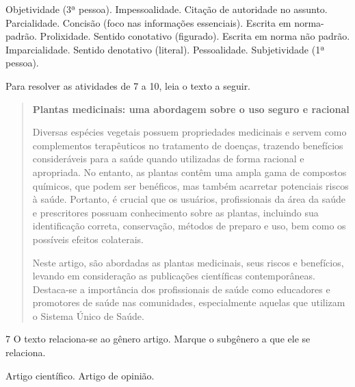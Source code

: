 \begin{boxlist}
 Objetividade (3ª pessoa). 
 Impessoalidade.
 Citação de autoridade no assunto. 
 Parcialidade. 
 Concisão (foco nas informações essenciais). 
 Escrita em norma-padrão. 
 Prolixidade.
 Sentido conotativo (figurado).
 Escrita em norma não padrão. 
Imparcialidade.
 Sentido denotativo (literal).
 Pessoalidade.
 Subjetividade (1ª pessoa).
\end{boxlist}

Para resolver as atividades de 7 a 10, leia o texto a seguir.

\begin{quote}
\textbf{Plantas medicinais: uma abordagem sobre o uso seguro e racional}

Diversas espécies vegetais possuem propriedades medicinais e servem como
complementos terapêuticos no tratamento de doenças, trazendo benefícios
consideráveis para a saúde quando utilizadas de forma racional e
apropriada. No entanto, as plantas contêm uma ampla gama de compostos
químicos, que podem ser benéficos, mas também acarretar potenciais
riscos à saúde. Portanto, é crucial que os usuários, profissionais da
área da saúde e prescritores possuam conhecimento sobre as plantas,
incluindo sua identificação correta, conservação, métodos de preparo e
uso, bem como os possíveis efeitos colaterais.

Neste artigo, são abordadas as plantas medicinais, seus riscos e
benefícios, levando em consideração as publicações científicas
contemporâneas. Destaca-se a importância dos profissionais de saúde como
educadores e promotores de saúde nas comunidades, especialmente aquelas
que utilizam o Sistema Único de Saúde.

\end{quote}

\num{7} O texto relaciona-se ao gênero artigo. Marque o subgênero a que
ele se relaciona.

\begin{boxlist}
 Artigo científico.
 Artigo de opinião.
\end{boxlist}

